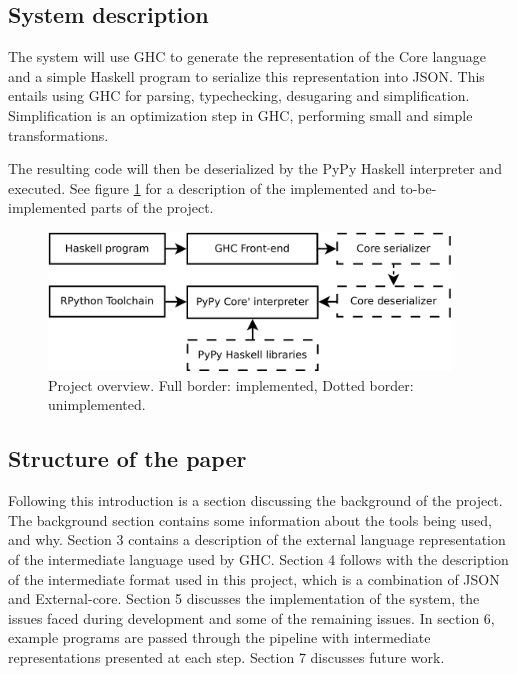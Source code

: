 \subsection{System description}

The system will use GHC to generate the 
representation of the Core language and a simple Haskell program to 
serialize this representation into JSON. This entails using GHC for
parsing, typechecking, desugaring and simplification. Simplification
is an optimization step in GHC, performing small and simple transformations.

The resulting code will then be deserialized by the PyPy Haskell interpreter 
and executed. See figure \ref{overview} for a description of the implemented and
to-be-implemented parts of the project.

\begin{figure}[H]
\centering
\includegraphics[width=0.95\textwidth]{diags/overview}
\caption[Project overview]{Project overview. Full border: implemented, Dotted border: unimplemented.}
\label{overview}
\end{figure}

\subsection{Structure of the paper}

Following this introduction is a section discussing the 
background of the project. The background section contains some information 
about the tools being used, and why.
Section 3 contains a description of the external language representation
of the intermediate language used by GHC.
Section 4 follows with the description of 
the intermediate format
used in this project, which is a combination of JSON and External-core.
Section 5 discusses the implementation of the system, the issues faced
during development and some of the remaining issues.
In section 6, example programs are passed through the pipeline 
with intermediate representations presented at each step.
Section 7 discusses future work.


